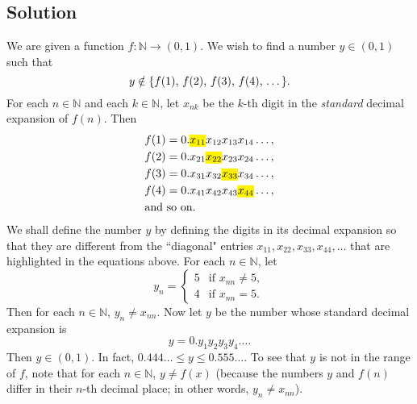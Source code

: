 \documentclass{article}
\begin{document}
\subsection*{Solution}
    We are given a function $f: \mathbb{N} \rightarrow (0, 1)$. We wish to find a number $y \in (0, 1)$ such that $$y \notin \{\text{$f(1)$, $f(2)$, $f(3)$, $f(4)$, \dots}\}.$$ For each $n \in \mathbb{N}$ and each $k \in \mathbb{N}$, let $x_{nk}$ be the $k$-th digit in the \textit{standard} decimal expansion of $f(n)$. Then 
    \begin{align*}
        &f(1) = 0.\text{\hl{$x_{11}$}}x_{12}x_{13}x_{14}\dots, \\
        &f(2) = 0.x_{21}\text{\hl{$x_{22}$}}x_{23}x_{24}\dots, \\
        &f(3) = 0.x_{31}x_{32}\text{\hl{$x_{33}$}}x_{34}\dots, \\
        &f(4) = 0.x_{41}x_{42}x_{43}\text{\hl{$x_{44}$}}\dots, \\
        &\text{and so on}.
    \end{align*}
    We shall define the number $y$ by defining the digits in its decimal expansion so that they are different from the ``diagonal" entries $x_{11}, x_{22}, x_{33}, x_{44}, \dots$ that are highlighted in the equations above. For each $n \in \mathbb{N}$, let
    $$y_n = 
    \begin{cases}
        5 & \text{if } x_{nn} \ne 5, \\
        4 & \text{if } x_{nn} = 5.
    \end{cases}$$
    Then for each $n \in \mathbb{N}$, $y_n \ne x_{nn}$. Now let $y$ be the number whose standard decimal expansion is $$y = 0.y_1y_2y_3y_4 \dots.$$ Then $y \in (0, 1)$. In fact, $0.444 \ldots \le y \le 0.555 \dots$. To see that $y$ is not in the range of $f$, note that for each $n \in \mathbb{N}$, $y \ne f(x)$ (because the numbers $y$ and $f(n)$ differ in their $n$-th decimal place; in other words, $y_n \ne x_{nn}$).
\end{document}
